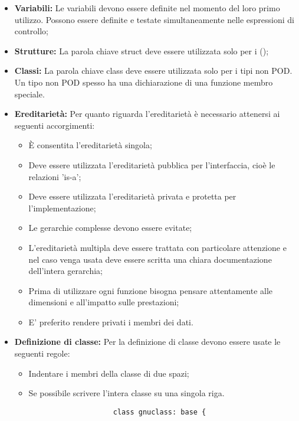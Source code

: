 \documentclass[../NomeDocumento.tex]{subfiles}
\begin{document}
\begin{itemize}
		\item \textbf{Variabili:} Le variabili devono essere definite nel momento del loro primo utilizzo. Possono essere definite e testate simultaneamente nelle espressioni di controllo;
		
		\item \textbf{Strutture:} La parola chiave struct deve essere utilizzata solo per i ();
		
		\item \textbf{Classi:} La parola chiave class deve essere utilizzata solo per i tipi non POD. Un tipo non POD spesso ha una dichiarazione di una funzione membro speciale.
		
		\item \textbf{Ereditarietà:} Per quanto riguarda l'ereditarietà è necessario attenersi ai seguenti accorgimenti:
		\begin{itemize}
			\item È consentita l'ereditarietà singola;
			\item Deve essere utilizzata l'ereditarietà pubblica per l'interfaccia, cioè le relazioni 'is-a';
			\item Deve essere utilizzata l'ereditarietà privata e protetta per l'implementazione; 		
			\item Le gerarchie complesse devono essere evitate;
			\item L'ereditarietà multipla deve essere trattata con particolare attenzione e nel caso venga usata deve essere scritta una chiara documentazione dell'intera gerarchia;	
			\item Prima di utilizzare ogni funzione bisogna pensare attentamente alle dimensioni e all'impatto sulle prestazioni;
			\item E' preferito rendere privati i membri dei dati.
		\end{itemize}
		
		\item \textbf{Definizione di classe:} Per la definizione di classe devono essere usate le seguenti regole:
		
		\begin{itemize}
			\item Indentare i membri della classe di due spazi;
			\item Se possibile scrivere l'intera classe su una singola riga.
				
				\begin{verbatim}
					class gnuclass: base {
				\end{verbatim}
					

\end{itemize}
\end{itemize}
\end{document}

